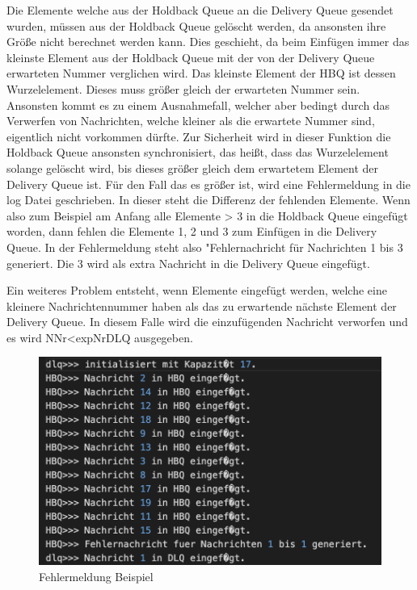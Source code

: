 Die Elemente welche aus der Holdback Queue an die Delivery Queue gesendet wurden, müssen aus der Holdback Queue gelöscht werden, da ansonsten ihre Größe nicht berechnet werden kann. 
Dies geschieht, da beim Einfügen immer das kleinste Element aus der Holdback Queue mit der von der Delivery Queue erwarteten Nummer verglichen wird. Das kleinste Element der HBQ ist dessen Wurzelelement. Dieses muss größer gleich der erwarteten Nummer sein. 
Ansonsten kommt es zu einem Ausnahmefall, welcher aber bedingt durch das Verwerfen von Nachrichten, welche kleiner als die erwartete Nummer sind, eigentlich nicht vorkommen dürfte. Zur Sicherheit wird in dieser Funktion die Holdback Queue ansonsten synchronisiert, das heißt, dass das Wurzelelement solange gelöscht wird, bis dieses größer gleich dem erwartetem Element der Delivery Queue ist. 
Für den Fall das es größer ist, wird eine Fehlermeldung in die log Datei geschrieben. In dieser steht die Differenz der fehlenden Elemente. Wenn also zum Beispiel am Anfang alle Elemente > 3 in die Holdback Queue eingefügt worden, dann fehlen die Elemente 1, 2 und 3 zum Einfügen in die Delivery Queue. In der Fehlermeldung steht also "Fehlernachricht für Nachrichten 1 bis 3 generiert. Die 3 wird als extra Nachricht in die Delivery Queue eingefügt.

Ein weiteres Problem entsteht, wenn Elemente eingefügt werden, welche eine kleinere Nachrichtennummer haben als das zu erwartende nächste Element der Delivery Queue. In diesem Falle wird die einzufügenden Nachricht verworfen und es wird NNr<expNrDLQ ausgegeben.

\begin{figure}[htbp]
\begin{center}
\includegraphics[scale=0.6]{Bilder/BeispielHBQFehler}
\caption{\label{fig:BeispielHBQFehler} Fehlermeldung Beispiel \cite{HBQfehler}} 
\end{center}
\end{figure}

